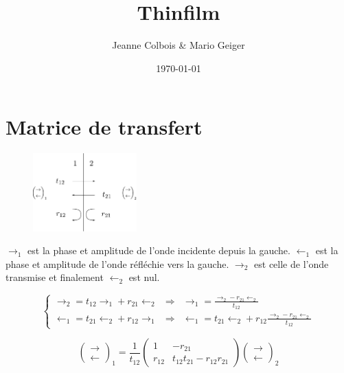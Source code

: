 \documentclass[a4paper,english]{article}
\begin{document}
\title{Thinfilm}
\author{Jeanne Colbois \& Mario Geiger}
\date{\today}
\maketitle

\section{Matrice de transfert}

\begin{figure}[H]
	\centering
	\includegraphics[height=3cm]{interface.pdf}
\end{figure}

$\rightarrow_1$ est la phase et amplitude de l'onde incidente depuis la gauche. $\leftarrow_1$ est la phase et amplitude de l'onde réfléchie vers la gauche. $\rightarrow_2$ est celle de l'onde transmise et finalement $\leftarrow_2$ est nul.

\begin{equation}
\left\{ \begin{array}{lll}
\rightarrow_2 = t_{12} \rightarrow_1 + r_{21} \leftarrow_2  &\Rightarrow &\rightarrow_1 = \frac{\rightarrow_2 - r_{21} \leftarrow_2}{t_{12}} \\
\leftarrow_1 = t_{21} \leftarrow_2 + r_{12} \rightarrow_1 &\Rightarrow &\leftarrow_1 = t_{21} \leftarrow_2 + r_{12} \frac{\rightarrow_2 - r_{21} \leftarrow_2}{t_{12}}
\end{array}\right. 
\end{equation}

\begin{equation}\label{mtrans}
\begin{pmatrix}\rightarrow \\ \leftarrow \end{pmatrix}_1 = 
\frac{1}{t_{12}}\begin{pmatrix} 1 & -r_{21} \\ r_{12} & t_{12}t_{21} - r_{12}r_{21} \end{pmatrix} 
\begin{pmatrix}\rightarrow \\ \leftarrow\end{pmatrix}_2
\end{equation}
\end{document}
